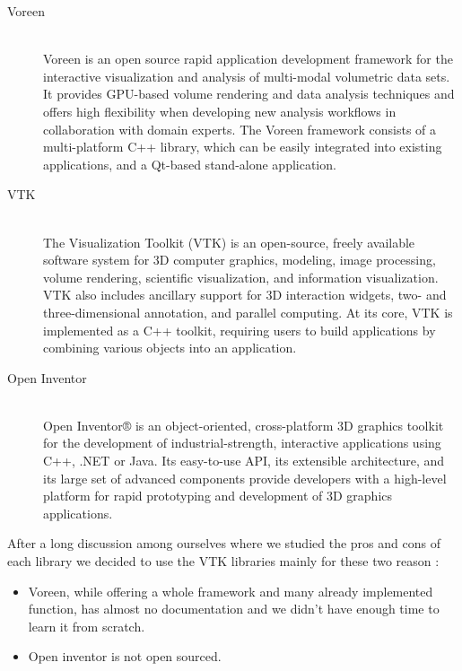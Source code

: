 \documentclass[11pt]{article} %
\begin{document}
\begin{description}

\item[Voreen]\hfill \\ 
 Voreen is an open source rapid application development framework for the interactive visualization and analysis of multi-modal volumetric data sets. It provides GPU-based volume rendering and data analysis techniques and offers high flexibility when developing new analysis workflows in collaboration with domain experts. The Voreen framework consists of a multi-platform C++ library, which can be easily integrated into existing applications, and a Qt-based stand-alone application.
 \item[VTK] \hfill \\
The Visualization Toolkit (VTK) is an open-source, freely available software system for 3D computer graphics, modeling, image processing, volume rendering, scientific visualization, and information visualization. VTK also includes ancillary support for 3D interaction widgets, two- and three-dimensional annotation, and parallel computing. At its core, VTK is implemented as a C++ toolkit, requiring users to build applications by combining various objects into an application. 
 \item[Open Inventor] \hfill \\
Open Inventor® is an object-oriented, cross-platform 3D graphics toolkit for the development of industrial-strength, interactive applications using C++, .NET or Java.
Its easy-to-use API, its extensible architecture, and its large set of advanced components provide developers with a high-level platform for rapid prototyping and development of 3D graphics applications.

\end{description}

\noindent
After a long discussion among ourselves where we studied the pros and cons of each library we decided to use the VTK libraries mainly for these two reason :
\begin{itemize}
\item Voreen, while offering a whole framework and many already implemented function, has almost no documentation and we didn't have enough time to learn it from scratch. %
\item Open inventor is not open sourced. 
\end{itemize}

\end{document}
